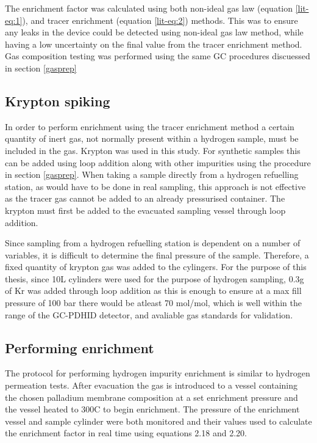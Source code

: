 The enrichment factor was calculated using both non-ideal gas law (equation \ref{lit-eq:1}), and tracer enrichment (equation \ref{lit-eq:2}) methods. This was to ensure any leaks in the device could be detected using non-ideal gas law method, while having a low uncertainty on the final value from the tracer enrichment method. Gas composition testing was performed using the same GC procedures discuessed in section \ref{gasprep}
\subsection{Krypton spiking}
In order to perform enrichment using the tracer enrichment method a certain quantity of inert gas, not normally present within a hydrogen sample, must be included in the gas. Krypton was used in this study. For synthetic samples this can be added using loop addition along with other impurities using the procedure in section \ref{gasprep}. When taking a sample directly from a hydrogen refuelling station, as would have to be done in real sampling, this approach is not effective as the tracer gas cannot be added to an already pressurised container. The krypton must first be added to the evacuated sampling vessel through loop addition.

Since sampling from a hydrogen refuelling station is dependent on a number of variables, it is difficult to determine the final pressure of the sample. Therefore, a fixed quantity of krypton gas was added to the cylingers. For the purpose of this thesis, since 10L cylinders were used for the purpose of hydrogen sampling, 0.3g of Kr was added through loop addition as this is enough to ensure at a max fill pressure of 100 bar there would be atleast 70 \textmu mol/mol, which is well within the range of the GC-PDHID detector, and avaliable gas standards for validation. 

\subsection{Performing enrichment}
The protocol for performing hydrogen impurity enrichment is similar to hydrogen permeation tests. After evacuation the gas is introduced to a vessel containing the chosen palladium membrane composition at a set enrichment pressure and the vessel heated to 300\textdegree C to begin enrichment. The pressure of the enrichment vessel and sample cylinder were both monitored and their values used to calculate the enrichment factor in real time using equations 2.18 and 2.20. 


